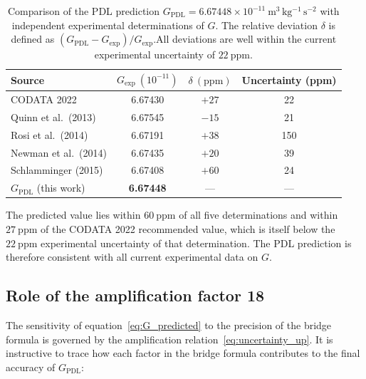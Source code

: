 \documentclass[11pt,a4paper]{article}
\begin{document}
\begin{table}[ht]
\centering
\caption{Comparison of the PDL prediction $G_{\mathrm{PDL}} = 6.67448 \times 10^{-11}\ \mathrm{m^3\,kg^{-1}\,s^{-2}}$ with independent experimental determinations of $G$. The relative deviation $\delta$ is defined as $(G_{\mathrm{PDL}} - G_{\mathrm{exp}})/G_{\mathrm{exp}}$.All deviations are well within the current experimental uncertainty of $22\ \mathrm{ppm}$.}

\bigskip

\label{tab:G_comparison}
\begin{tabular}{lccc}
\toprule
Source 
    & $G_{\mathrm{exp}}\ (10^{-11})$ 
    & $\delta\ (\mathrm{ppm})$ 
    & Uncertainty (ppm) \\
\midrule
CODATA 2022              & 6.67430 & $+27$ & 22  \\
Quinn et al.\ (2013)     & 6.67545 & $-15$ & 21  \\
Rosi et al.\ (2014)      & 6.67191 & $+38$ & 150 \\
Newman et al.\ (2014)    & 6.67435 & $+20$ & 39  \\
Schlamminger (2015)      & 6.67408 & $+60$ & 24  \\
\midrule
$G_{\mathrm{PDL}}$ (this work) 
    & \textbf{6.67448} & --- & --- \\
\bottomrule
\end{tabular}
\end{table}

The predicted value lies within $60\ \mathrm{ppm}$ of all five determinations and within $27\ \mathrm{ppm}$ of the CODATA 2022 recommended value, which is itself below the $22\ \mathrm{ppm}$ experimental uncertainty of that determination. The PDL prediction is therefore consistent with all current experimental data on $G$.

\subsection{Role of the amplification factor 18}

The sensitivity of equation~\eqref{eq:G_predicted} to the precision of the bridge formula is governed by the amplification relation~\eqref{eq:uncertainty_up}. It is instructive to trace how each factor in the bridge formula contributes to the final accuracy of $G_{\mathrm{PDL}}$:
\end{document}
